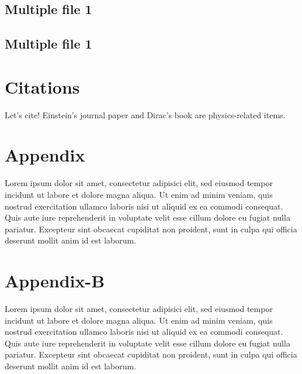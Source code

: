 \documentclass[a4paper, oneside]{book}
\begin{document}
\section{Multiple file 1}


\section{Multiple file 1}



\chapter{Citations}

Let's cite! Einstein's journal paper \cite{einstein} and Dirac's
book \cite{dirac} are physics-related items.

\printbibliography

\appendix
\chapter{Appendix}
Lorem ipsum dolor sit amet, consectetur adipisici elit, sed eiusmod tempor incidunt ut labore et dolore magna aliqua. Ut enim ad minim veniam, quis nostrud exercitation ullamco laboris nisi ut aliquid ex ea commodi consequat. Quis aute iure reprehenderit in voluptate velit esse cillum dolore eu fugiat nulla pariatur. Excepteur sint obcaecat cupiditat non proident, sunt in culpa qui officia deserunt mollit anim id est laborum.

\chapter{Appendix-B}
Lorem ipsum dolor sit amet, consectetur adipisici elit, sed eiusmod tempor incidunt ut labore et dolore magna aliqua. Ut enim ad minim veniam, quis nostrud exercitation ullamco laboris nisi ut aliquid ex ea commodi consequat. Quis aute iure reprehenderit in voluptate velit esse cillum dolore eu fugiat nulla pariatur. Excepteur sint obcaecat cupiditat non proident, sunt in culpa qui officia deserunt mollit anim id est laborum.
\end{document}

